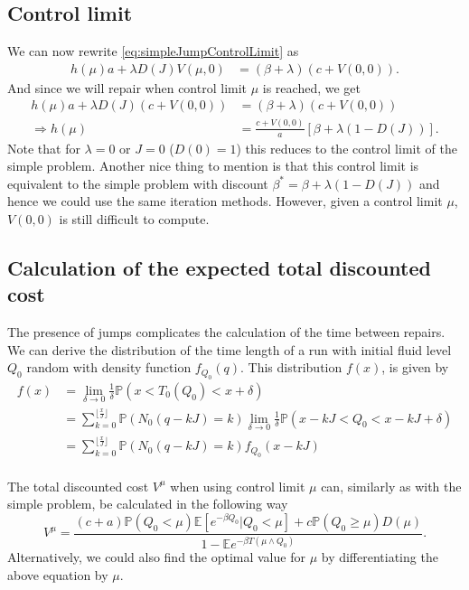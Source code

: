 \subsection{Control limit}
We can now rewrite \eqref{eq:simpleJumpControlLimit} as
\begin{equation}
\begin{split}
h(\mu)a+\lambda D(J)V(\mu,0)&=(\beta+\lambda)(c+V(0,0)).
\end{split}
\end{equation}
And since we will repair when control limit $\mu$ is reached, we get
\begin{equation}
\begin{split}
h(\mu)a+\lambda D(J)(c+V(0,0))&=(\beta+\lambda)(c+V(0,0))\\
\Rightarrow h(\mu)&=\frac{c+V(0,0)}{a}[\beta+\lambda(1-D(J))].
\end{split}
\end{equation}
Note that for $\lambda=0$ or $J=0$ ($D(0)=1$) this reduces to the control limit of the simple problem.
Another nice thing to mention is that this control limit is equivalent to the simple problem with discount $\beta^*=\beta+\lambda(1-D(J))$ and hence we could use the same iteration methods.
However, given a control limit $\mu$, $V(0,0)$ is still difficult to compute.

\subsection{Calculation of the expected total discounted cost}
The presence of jumps complicates the calculation of the time between repairs.
We can derive the distribution of the time length of a run with initial fluid level $Q_0$ random with density function $f_{Q_0}(q)$.
This distribution $f(x)$, is given by
\begin{equation}
\begin{split}
f(x)&=\lim\limits_{\delta\rightarrow 0}\frac{1}{\delta}\mathbb{P}(x<T_0(Q_0)<x+\delta)\\
&=\sum\limits_{k=0}^{\lfloor\frac{x}{J}\rfloor}\mathbb{P}(N_0(q-kJ)=k)\lim\limits_{\delta\rightarrow 0}\frac{1}{\delta}\mathbb{P}(x-kJ<Q_0<x-kJ+\delta)\\
&=\sum\limits_{k=0}^{\lfloor\frac{x}{J}\rfloor}\mathbb{P}(N_0(q-kJ)=k)f_{Q_0}(x-kJ)\\
\end{split}
\end{equation}

The total discounted cost $V^\mu$ when using control limit $\mu$ can, similarly as with the simple problem, be calculated in the following way
\begin{equation}
V^\mu=\frac{(c+a)\mathbb{P}(Q_0<\mu)\mathbb{E}[e^{-\beta Q_0}|Q_0<\mu]+c\mathbb{P}(Q_0\geq \mu)D(\mu)}{1-\mathbb{E}e^{-\beta T(\mu\wedge Q_0)}}.
\end{equation}
Alternatively, we could also find the optimal value for $\mu$ by differentiating the above equation by $\mu$.

